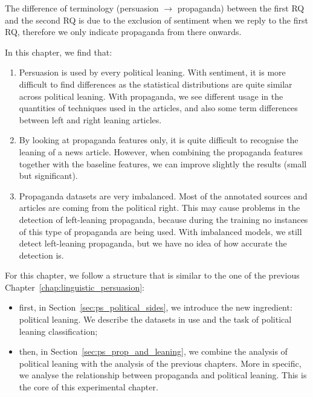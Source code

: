 The difference of terminology (persuasion $\rightarrow$ propaganda) between the first RQ and the second RQ is due to the exclusion of sentiment when we reply to the first RQ, therefore we only indicate propaganda from there onwards.

In this chapter, we find that:
\begin{enumerate}
    \item Persuasion is used by every political leaning. With sentiment, it is more difficult to find differences as the statistical distributions are quite similar across political leaning. With propaganda, we see different usage in the quantities of techniques used in the articles, and also some term differences between left and right leaning articles.
    \item By looking at propaganda features only, it is quite difficult to recognise the leaning of a news article. However, when combining the propaganda features together with the baseline features, we can improve slightly the results (small but significant).
    \item Propaganda datasets are very imbalanced. Most of the annotated sources and articles are coming from the political right. This may cause problems in the detection of left-leaning propaganda, because during the training no instances of this type of propaganda are being used. With imbalanced models, we still detect left-leaning propaganda, but we have no idea of how accurate the detection is.
\end{enumerate}

For this chapter, we follow a structure that is similar to the one of the previous Chapter~\ref{chap:linguistic_persuasion}:
\begin{itemize}
    \item first, in Section~\ref{sec:ps_political_sides}, we introduce the new ingredient: political leaning. We describe the datasets in use and the task of political leaning classification;
    \item then, in Section~\ref{sec:ps_prop_and_leaning}, we combine the analysis of political leaning with the analysis of the previous chapters. More in specific, we analyse the relationship between propaganda and political leaning. This is the core of this experimental chapter.
\end{itemize}


